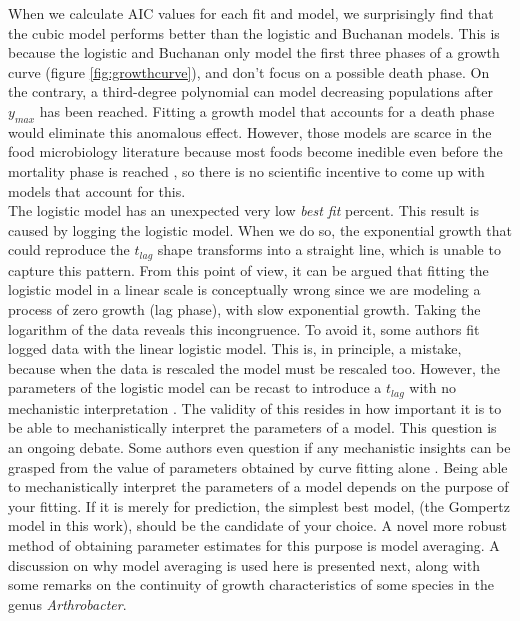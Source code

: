 \documentclass[titlepage,11pt]{article}
\begin{document}
\begin{linenumbers}
			When we calculate AIC values for each fit and model, we surprisingly find that the cubic model performs better than the logistic and Buchanan models. This is because the logistic and Buchanan only model the first three phases of a growth curve (figure \ref{fig:growthcurve}), and don't focus on a possible death phase. On the contrary, a third-degree polynomial can model decreasing populations after $ y_{max} $ has been reached. Fitting a growth model that accounts for a death phase \cite{Peleg2009, Baranyi1996} would eliminate this anomalous effect. However, those models are scarce in the food microbiology literature because most foods become inedible even before the mortality phase is reached \cite{Micha2011}, so there is no scientific incentive to come up with models that account for this.\\
			The logistic model has an unexpected very low \textit{best fit} percent. This result is caused by logging the logistic model. When we do so, the exponential growth that could reproduce the $ t_{lag} $ shape transforms into a straight line, which is unable to capture this pattern. From this point of view, it can be argued that fitting the logistic model in a linear scale is conceptually wrong since we are modeling a process of zero growth (lag phase), with slow exponential growth. Taking the logarithm of the data reveals this incongruence. To avoid it, some authors \cite{Micha2011, Zwietering1990} fit logged data with the linear logistic model. This is, in principle, a mistake, because when the data is rescaled the model must be rescaled too. However, the parameters of the logistic model can be recast to introduce a $ t_{lag} $ with no mechanistic interpretation \cite{Zwietering1990}. The validity of this resides in how important it is to be able to mechanistically interpret the parameters of a model. This question is an ongoing debate. Some authors even question if any mechanistic insights can be grasped from the value of parameters obtained by curve fitting alone \cite{Micha2011}. Being able to mechanistically interpret the parameters of a model depends on the purpose of your fitting. If it is merely for prediction, the simplest best model, (the Gompertz model in this work), should be the candidate of your choice. A  novel more robust method of obtaining parameter estimates for this purpose is model averaging. A discussion on why model averaging is used here is presented next, along with some remarks on the continuity of growth characteristics of some species in the genus \textit{Arthrobacter}.\\
			

\end{linenumbers}
\end{document}

